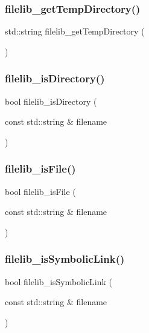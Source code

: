 \subsubsection{\texorpdfstring{filelib\+\_\+get\+Temp\+Directory()}{filelib\_getTempDirectory()}}
{\footnotesize\ttfamily std\+::string filelib\+\_\+get\+Temp\+Directory (\begin{DoxyParamCaption}{ }\end{DoxyParamCaption})}

\mbox{\label{namespaceplatform_a68319ac7586223f385d7785f1b38e1b9}} 
\subsubsection{\texorpdfstring{filelib\+\_\+is\+Directory()}{filelib\_isDirectory()}}
{\footnotesize\ttfamily bool filelib\+\_\+is\+Directory (\begin{DoxyParamCaption}\item[{const std\+::string \&}]{filename }\end{DoxyParamCaption})}

\mbox{\label{namespaceplatform_aca0d9e2b4896bfd0f7a5cd64049188fc}} 
\subsubsection{\texorpdfstring{filelib\+\_\+is\+File()}{filelib\_isFile()}}
{\footnotesize\ttfamily bool filelib\+\_\+is\+File (\begin{DoxyParamCaption}\item[{const std\+::string \&}]{filename }\end{DoxyParamCaption})}

\mbox{\label{namespaceplatform_a69dc63b6fb991650c05dde15b04ca465}} 
\subsubsection{\texorpdfstring{filelib\+\_\+is\+Symbolic\+Link()}{filelib\_isSymbolicLink()}}
{\footnotesize\ttfamily bool filelib\+\_\+is\+Symbolic\+Link (\begin{DoxyParamCaption}\item[{const std\+::string \&}]{filename }\end{DoxyParamCaption})}

